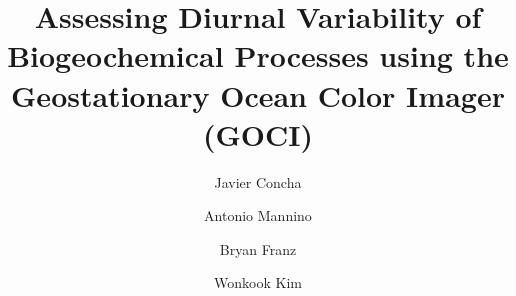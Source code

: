 \documentclass[onecolumn,3p,letterpaper,11pt]{elsarticle}
\begin{document}
\linenumbers

\begin{frontmatter}

\title{Assessing Diurnal Variability of Biogeochemical Processes using the Geostationary Ocean Color Imager (GOCI)}


\author[oeladdress,usraaddress]{Javier Concha}

\author[oeladdress]{Antonio Mannino}

\author[oeladdress]{Bryan Franz}


\author[kiostaddress]{Wonkook Kim}


\address[oeladdress]{Ocean Ecology Lab, NASA Goddard Space Flight Center, Greenbelt, MD, USA}
\address[usraaddress]{Universities Space Research Association, Columbia, MD, USA}
\address[kiostaddress]{Korea Institute of Ocean Science and Technology, 787 Haean-ro, Ansan, Republic of Korea}

\begin{abstract}


\end{abstract}
\end{frontmatter}
\end{document}
